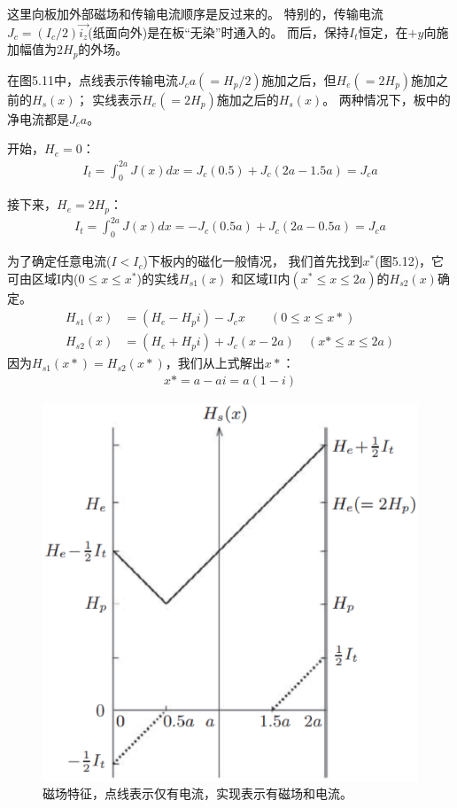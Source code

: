 这里向板加外部磁场和传输电流顺序是反过来的。
特别的，传输电流$J_c=(I_c/2)\vec{i_z}$(纸面向外)是在板“无染”时通入的。
而后，保持$I_t$恒定，在$+y$向施加幅值为$2H_p$的外场。

在图5.11中，点线表示传输电流$J_c a(=H_p/2)$施加之后，但$H_e(=2H_p)$施加之前的$H_s(x)$；
实线表示$H_e(=2H_p)$施加之后的$H_s(x)$。
两种情况下，板中的净电流都是$J_c a$。

开始，$H_e=0$：
\begin{align*}%
I_{t}=\int_{0}^{2a}J(x)dx=J_{c}(0.5)+J_{c}(2a-1.5a)=J_{c}a
\end{align*}

接下来，$H_e=2H_p$：
\begin{align*}%
I_{t}=\int_{0}^{2a}J(x)dx=-J_{c}(0.5a)+J_{c}(2a-0.5a)=J_{c}a
\end{align*}

为了确定任意电流($I<I_c$)下板内的磁化一般情况，
我们首先找到$x^*$(图5.12)，它可由区域I内($0\le x\le x^*$)的实线$H_{s1}(x)$
和区域II内$(x^*\le x\le 2a)$的$H_{s2}(x)$确定。
\begin{align*}
H_{s1}(x)&=(H_{e}-H_{p}i)-J_{c}x\qquad(0\leq x \leq x*)\\
H_{s2}(x)&=(H_{e}+H_{p}i)+J_{c}(x-2a)\quad(x*\leq x \le  2a)
\end{align*}
因为$H_{s1}(x*)=H_{s2}(x*)$，我们从上式解出$x*$：
\begin{align*}%
x*=a-ai=a(1-i)
\end{align*}

\begin{figure}[htbp]
	\centering
	\includegraphics[scale=0.5]{chpt5/figs/fig5.11.eps}
	\caption{磁场特征，点线表示仅有电流，实现表示有磁场和电流。}
\end{figure}

